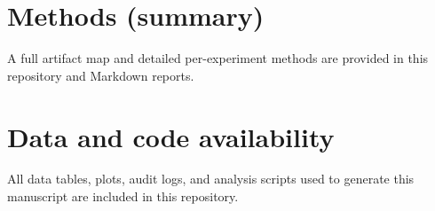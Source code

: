 \documentclass[10pt]{article}
\begin{document}
\section{Methods (summary)}
A full artifact map and detailed per-experiment methods are provided in this repository and Markdown reports.

\section*{Data and code availability}
All data tables, plots, audit logs, and analysis scripts used to generate this manuscript are included in this repository.
\end{document}
